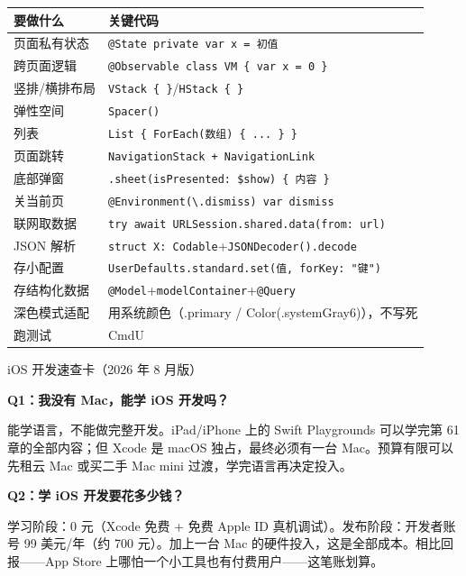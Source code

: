 


\begin{center}
\begin{tabularx}{\linewidth}{|X|X|}
\hline
\textbf{要做什么} & \textbf{关键代码} \tabularnewline
\hline
页面私有状态 & \texttt{@State private var x = 初值} \tabularnewline
跨页面逻辑 & \texttt{@Observable class VM \{ var x = 0 \}} \tabularnewline
竖排/横排布局 & \texttt{VStack \{ \}}/\texttt{HStack \{ \}} \tabularnewline
弹性空间 & \texttt{Spacer()} \tabularnewline
列表 & \texttt{List \{ ForEach(数组) \{ ... \} \}} \tabularnewline
页面跳转 & \texttt{NavigationStack + NavigationLink} \tabularnewline
底部弹窗 & \texttt{.sheet(isPresented: \$show) \{ 内容 \}} \tabularnewline
关当前页 & \texttt{@Environment(\textbackslash{}.dismiss) var dismiss} \tabularnewline
联网取数据 & \texttt{try await URLSession.shared.data(from: url)} \tabularnewline
JSON 解析 & \texttt{struct X: Codable}+\texttt{JSONDecoder().decode} \tabularnewline
存小配置 & \texttt{UserDefaults.standard.set(值, forKey: "键")} \tabularnewline
存结构化数据 & \texttt{@Model}+\texttt{modelContainer}+\texttt{@Query} \tabularnewline
深色模式适配 & 用系统颜色（.primary / Color(.systemGray6)），不写死 \tabularnewline
跑测试 & CmdU \tabularnewline
\hline
\end{tabularx}
\end{center}

\begin{center}\small\color{gray}iOS 开发速查卡（2026 年 8 月版）\end{center}


\textbf{Q1：我没有 Mac，能学 iOS 开发吗？}

能学语言，不能做完整开发。iPad/iPhone 上的 Swift Playgrounds 可以学完第 61 章的全部内容；但 Xcode 是 macOS 独占，最终必须有一台 Mac。预算有限可以先租云 Mac 或买二手 Mac mini 过渡，学完语言再决定投入。

\textbf{Q2：学 iOS 开发要花多少钱？}

学习阶段：0 元（Xcode 免费 + 免费 Apple ID 真机调试）。发布阶段：开发者账号 99 美元/年（约 700 元）。加上一台 Mac 的硬件投入，这是全部成本。相比回报——App Store 上哪怕一个小工具也有付费用户——这笔账划算。

